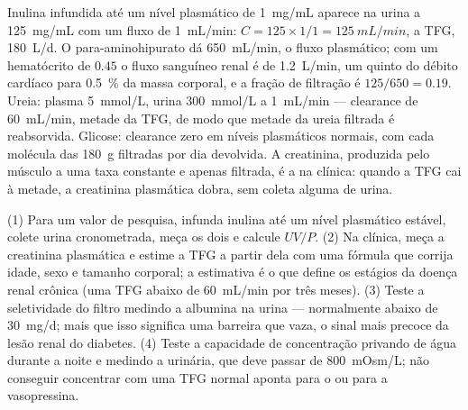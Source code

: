 \begin{example}\label{ex:b3:renal-osmoregulation:numbers}
Inulina infundida até um nível plasmático de \qty{1}{mg/mL} aparece na
urina a \qty{125}{mg/mL} com um fluxo de \qty{1}{mL/min}: $C = 125\times 1/1 =
\qty{125}{mL/min}$, a TFG, \qty{180}{L/d}. O para-aminohipurato
dá \qty{650}{mL/min}, o fluxo plasmático; com um hematócrito de $0.45$ o
fluxo sanguíneo renal é de \qty{1.2}{L/min}, um quinto do débito
cardíaco para \qty{0.5}{\%} da massa corporal, e a fração de filtração é
$125/650 = 0.19$. Ureia: plasma \qty{5}{mmol/L}, urina \qty{300}{mmol/L}
a \qty{1}{mL/min} --- clearance de \qty{60}{mL/min}, metade da TFG, de
modo que metade da ureia filtrada é reabsorvida. Glicose: clearance zero
em níveis plasmáticos normais, com cada molécula das \qty{180}{g}
filtradas por dia devolvida. A creatinina, produzida pelo músculo a uma
taxa constante e apenas filtrada, é a  na clínica: quando a
TFG cai à metade, a creatinina plasmática dobra, sem coleta alguma de
urina.
\end{example}

\begin{method}\label{met:b3:renal-osmoregulation:gfr}
(1) Para um valor de pesquisa, infunda inulina até um nível plasmático
estável, colete urina cronometrada, meça os dois e calcule $UV/P$. (2)
Na clínica, meça a creatinina plasmática e estime a TFG a partir dela
com uma fórmula que corrija idade, sexo e tamanho corporal; a estimativa
é o que define os estágios da doença renal crônica (uma TFG abaixo de
\qty{60}{mL/min} por três meses). (3) Teste a seletividade do filtro
medindo a albumina na urina --- normalmente abaixo de \qty{30}{mg/d};
mais que isso significa uma barreira que vaza, o sinal mais precoce da
lesão renal do diabetes. (4) Teste a capacidade de concentração privando
de água durante a noite e medindo a  urinária, que deve
passar de \qty{800}{mOsm/L}; não conseguir concentrar com uma TFG normal
aponta para o  ou para a vasopressina.
\end{method}

